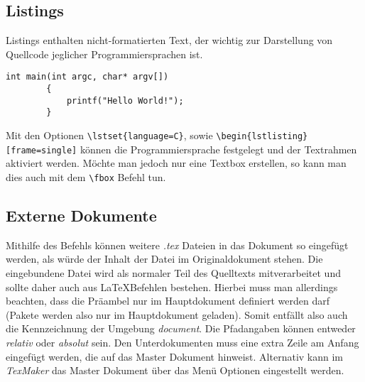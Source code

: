 \documentclass[10pt]{article}  %
\begin{document}
    \subsection{Listings}
        Listings enthalten nicht-formatierten Text, der wichtig zur Darstellung von Quellcode jeglicher Programmiersprachen ist.
    \lstset{language=C}
    \begin{lstlisting}[frame=single]
        int main(int argc, char* argv[]) 
        {
            printf("Hello World!");
        }
    \end{lstlisting}
    Mit den Optionen \verb!\lstset{language=C}!, sowie \verb!\begin{lstlisting}[frame=single]! können die Programmiersprache festgelegt und der Textrahmen aktiviert werden.
    Möchte man jedoch nur eine Textbox erstellen, so kann man dies auch mit dem \verb!\fbox! Befehl tun.

    \subsection{Externe Dokumente}
        Mithilfe des \verb!! Befehls können weitere \emph{.tex} Dateien in das Dokument so eingefügt werden, als würde der Inhalt der Datei im Originaldokument stehen.
        Die eingebundene Datei wird als normaler Teil des Quelltexts mitverarbeitet und sollte daher auch aus \LaTeX \@ Befehlen bestehen.
        Hierbei muss man allerdings beachten, dass die Präambel nur im Hauptdokument definiert werden darf (Pakete werden also nur im Hauptdokument geladen).
        Somit entfällt also auch die Kennzeichnung der Umgebung \emph{document}.
        Die Pfadangaben können entweder \emph{relativ} oder \emph{absolut} sein. Den Unterdokumenten muss eine extra Zeile am Anfang eingefügt werden, die auf das Master Dokument hinweist. Alternativ kann im \emph{TexMaker}
        das Master Dokument über das Menü Optionen eingestellt werden.
\end{document}
